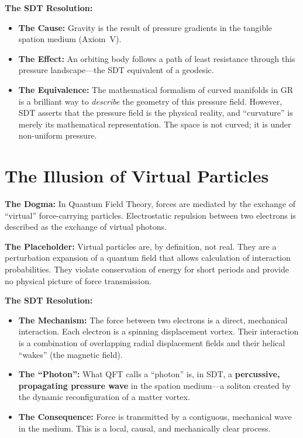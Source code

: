 \textbf{The SDT Resolution:}
\begin{itemize}
  \item \textbf{The Cause:} Gravity is the result of pressure gradients in the tangible spation medium (Axiom~V).
  \item \textbf{The Effect:} An orbiting body follows a path of least resistance through this pressure landscape---the SDT equivalent of a geodesic.
  \item \textbf{The Equivalence:} The mathematical formalism of curved manifolds in GR is a brilliant way to \emph{describe} the geometry of this pressure field.  However, SDT asserts that the pressure field is the physical reality, and ``curvature'' is merely its mathematical representation.  The space is not curved; it is under non-uniform pressure.
\end{itemize}


\section{The Illusion of Virtual Particles}

\textbf{The Dogma:} In Quantum Field Theory, forces are mediated by the exchange of ``virtual'' force-carrying particles.  Electrostatic repulsion between two electrons is described as the exchange of virtual photons.

\textbf{The Placeholder:} Virtual particles are, by definition, not real.  They are a perturbation expansion of a quantum field that allows calculation of interaction probabilities.  They violate conservation of energy for short periods and provide no physical picture of force transmission.

\textbf{The SDT Resolution:}
\begin{itemize}
  \item \textbf{The Mechanism:} The force between two electrons is a direct, mechanical interaction.  Each electron is a spinning displacement vortex.  Their interaction is a combination of overlapping radial displacement fields and their helical ``wakes'' (the magnetic field).
  \item \textbf{The ``Photon'':} What QFT calls a ``photon'' is, in SDT, a \textbf{percussive, propagating pressure wave} in the spation medium---a soliton created by the dynamic reconfiguration of a matter vortex.
  \item \textbf{The Consequence:} Force is transmitted by a contiguous, mechanical wave in the medium.  This is a local, causal, and mechanically clear process.
\end{itemize}


